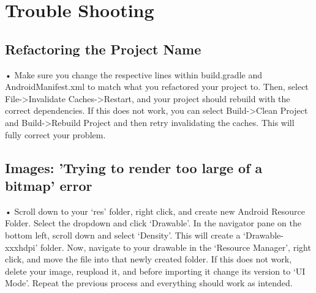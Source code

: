 \documentclass[letterpaper,12pt]{report}
\begin{document}
\section*{Trouble Shooting}\label{sec:Trouble Shooting}
    
\subsection*{Refactoring the Project Name}

• Make sure you change the respective lines within build.gradle and AndroidManifest.xml to match what you refactored your project to. Then, select File->Invalidate Caches->Restart, and your project should rebuild with the correct dependencies. If this does not work, you can select Build->Clean Project and Build->Rebuild Project and then retry invalidating the caches. This will fully correct your problem.

\subsection*{Images: 'Trying to render too large of a bitmap' error}

 • Scroll down to your ‘res’ folder, right click, and create new Android Resource Folder. Select the dropdown and click ‘Drawable’. In the navigator pane on the bottom left, scroll down and select ‘Density’. This will create a ‘Drawable-xxxhdpi’ folder. Now, navigate to your drawable in the ‘Resource Manager’, right click, and move the file into that newly created folder. If this does not work, delete your image, reupload it, and before importing it change its version to ‘UI Mode’. Repeat the previous process and everything should work as intended.



\end{document}
